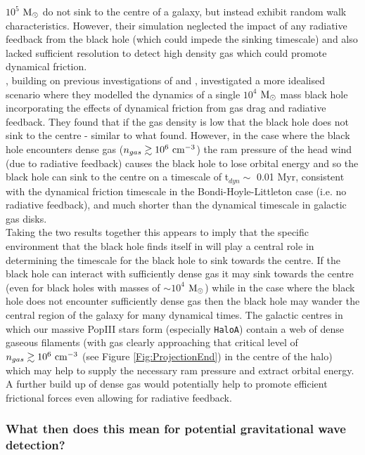 \documentclass[twocolumn,iop,revtex4]{openjournal}
\newcommand{\msolar} {$\rm{M_{\odot}}~$}
\newcommand{\msolarc} {$\rm{M_{\odot}}$}
\newcommand{\hac} {\texttt{HaloA}}
\begin{document}
$10^5$ \msolar do not sink to the centre of a galaxy, but instead exhibit random walk characteristics.
However, their simulation neglected the impact of any radiative feedback from the black hole 
(which could impede the sinking timescale) and
also lacked sufficient resolution to detect high density gas which could promote dynamical friction. \\
\indent \cite{Toyouchi_2020}, building on previous investigations of \cite{Park_2017} and \cite{Park_2019},
investigated a more idealised scenario where they modelled the
dynamics of a single $10^4$ \msolar mass black hole incorporating the effects of dynamical friction from gas drag
and radiative feedback. They found that if the gas density is low that the black hole
does not sink to the centre - similar to what \cite{Pfister_2019} found. However, in the case where
the black hole encounters dense gas ($n_{gas} \gtrsim 10^6 \ \rm{cm}^{-3}$) the ram pressure of
the head wind (due to radiative feedback)
causes the black hole to lose orbital energy and so the black hole can sink to the centre on a
timescale of t$_{dyn} \sim$ 0.01 Myr, consistent with the dynamical friction timescale
in the Bondi-Hoyle-Littleton case (i.e. no radiative feedback),
and much shorter than the dynamical timescale in galactic gas disks.\\
\indent Taking the two results together this
appears to imply that the specific environment that the black hole finds
itself in will play a central role in determining the timescale for the black hole
to sink towards the centre. If the black hole can interact with sufficiently dense gas it may
sink towards the centre (even for black holes with masses of $\sim 10^4$ \msolarc) while in
the case where the black hole does not encounter sufficiently dense gas then the black hole
may wander the central region of the galaxy for many dynamical times. The galactic centres
in which our massive PopIII
stars form (especially \hac) contain a web of dense gaseous filaments (with gas clearly approaching
that critical level of $n_{gas} \gtrsim 10^6  \ \rm{cm}^{-3}$ (see Figure \ref{Fig:ProjectionEnd}) in the centre of the halo)
which may help to supply
the necessary ram pressure and extract orbital energy. A further build up of dense gas would potentially
help to promote efficient frictional forces even allowing for radiative feedback.

\subsubsection*{What then does this mean for potential gravitational wave detection?}
\end{document}
